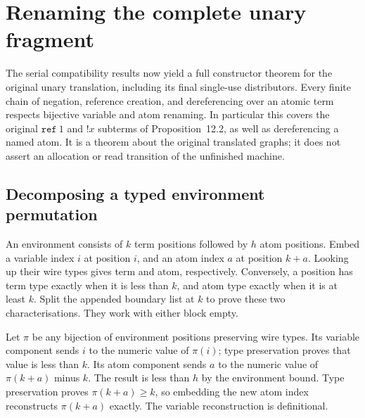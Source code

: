 \clearpage
\section{Renaming the complete unary fragment}
\label{sec:copying-unary-renaming}
The serial compatibility results now yield a full constructor theorem for the
original unary translation, including its final single-use distributors. Every
finite chain of negation, reference creation, and dereferencing over an atomic
term respects bijective variable and atom renaming. In particular this covers
the original $\mathtt{ref}\ 1$ and $!x$ subterms of Proposition~12.2, as well as
dereferencing a named atom. It is a theorem about the original translated graphs;
it does not assert an allocation or read transition of the unfinished machine.

\subsection{Decomposing a typed environment permutation}
An environment consists of $k$ term positions followed by $h$ atom positions.
Embed a variable index $i$ at position $i$, and an atom index $a$ at position
$k+a$. Looking up their wire types gives term and atom, respectively. Conversely,
a position has term type exactly when it is less than $k$, and atom type exactly
when it is at least $k$. Split the appended boundary list at $k$ to prove these
two characterisations. They work with either block empty.


Let $\pi$ be any bijection of environment positions preserving wire types.
Its variable component sends $i$ to the numeric value of $\pi(i)$; type
preservation proves that value is less than $k$. Its atom component sends $a$
to the numeric value of $\pi(k+a)$ minus $k$. The result is less than $h$ by the
environment bound. Type preservation proves $\pi(k+a)\geq k$, so embedding the
new atom index reconstructs $\pi(k+a)$ exactly. The variable reconstruction is
definitional.

